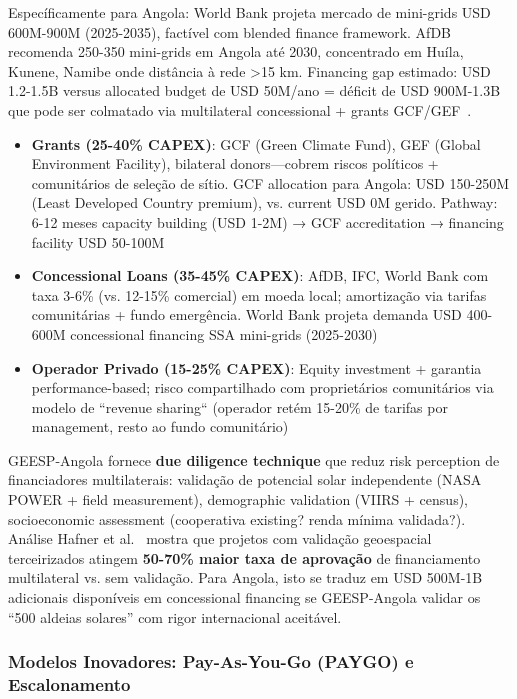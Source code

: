 \documentclass[12pt, a4paper]{article}
\begin{document}
Específicamente para Angola: World Bank projeta mercado de mini-grids USD 600M-900M (2025-2035), factível com blended finance framework. AfDB~\citep{AfDB2024AngolaAssessment} recomenda 250-350 mini-grids em Angola até 2030, concentrado em Huíla, Kunene, Namibe onde distância à rede >15 km. Financing gap estimado: USD 1.2-1.5B versus allocated budget de USD 50M/ano = déficit de USD 900M-1.3B que pode ser colmatado via multilateral concessional + grants GCF/GEF~\citep{GCFMiniGridFramework2024}.

\begin{itemize}
\item \textbf{Grants (25-40\% CAPEX)}: GCF (Green Climate Fund), GEF (Global Environment Facility), bilateral donors—cobrem riscos políticos + comunitários de seleção de sítio. GCF allocation para Angola: USD 150-250M (Least Developed Country premium), vs. current USD 0M gerido. Pathway: 6-12 meses capacity building (USD 1-2M) → GCF accreditation → financing facility USD 50-100M
\item \textbf{Concessional Loans (35-45\% CAPEX)}: AfDB, IFC, World Bank com taxa 3-6\% (vs. 12-15\% comercial) em moeda local; amortização via tarifas comunitárias + fundo emergência. World Bank projeta demanda USD 400-600M concessional financing SSA mini-grids (2025-2030)
\item \textbf{Operador Privado (15-25\% CAPEX)}: Equity investment + garantia performance-based; risco compartilhado com proprietários comunitários via modelo de ``revenue sharing`` (operador retém 15-20\% de tarifas por management, resto ao fundo comunitário)

\end{itemize}

GEESP-Angola fornece 
\textbf{due diligence technique} que reduz risk perception de financiadores multilaterais: validação de potencial solar independente (NASA POWER + field measurement), demographic validation (VIIRS + census), socioeconomic assessment (cooperativa existing? renda mínima validada?). Análise Hafner et al.~\citep{Hafner2020} mostra que projetos com validação geoespacial terceirizados atingem 
\textbf{50-70\% maior taxa de aprovação} de financiamento multilateral vs. sem validação. Para Angola, isto se traduz em USD 500M-1B adicionais disponíveis em concessional financing se GEESP-Angola validar os ``500 aldeias solares'' com rigor internacional aceitável.

\subsubsection{Modelos Inovadores: Pay-As-You-Go (PAYGO) e Escalonamento}
\end{document}
